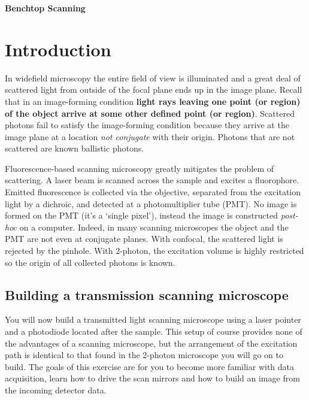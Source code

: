 \documentclass[a4paper]{report}
\begin{document}
\setcounter{secnumdepth}{2}

\begin{center}
\textbf{\Large{Benchtop Scanning}}
\end{center}

\section{Introduction}

In widefield microscopy the entire field of view is illuminated and a great deal of scattered light from outside of the focal plane ends up in the image plane. 
Recall that in an image-forming condition \textbf{light rays leaving one point (or region) of the object arrive at some other defined point (or region)}.
Scattered photons fail to satisfy the image-forming condition because they arrive at the image plane at a location \textit{not conjugate} with their origin.
Photons that are not scattered are known ballistic photons. 

Fluorescence-based scanning microscopy greatly mitigates the problem of scattering. 
A laser beam is scanned across the sample and excites a fluorophore. 
Emitted fluorescence is collected via the objective, separated from the excitation light by a dichroic, and detected at a photomultiplier tube (PMT). 
No image is formed on the PMT (it's a `single pixel'), instead the image is constructed \textit{post-hoc} on a computer.
Indeed, in many scanning microscopes the object and the PMT are not even at conjugate planes.
With confocal, the scattered light is rejected by the pinhole. 
With 2-photon, the excitation volume is highly restricted so the origin of all collected photons is known. 




\subsection{Building a transmission scanning microscope}
You will now build a transmitted light scanning microscope using a laser pointer and a photodiode located after the sample. 
This setup of course provides none of the advantages of a scanning microscope, but the arrangement of the excitation path is identical to that found in the 2-photon microscope you will go on to build. 
The goals of this exercise are for you to become more familiar with data acquisition, learn how to drive the scan mirrors and how to build an image from the incoming detector data. 
\end{document}
